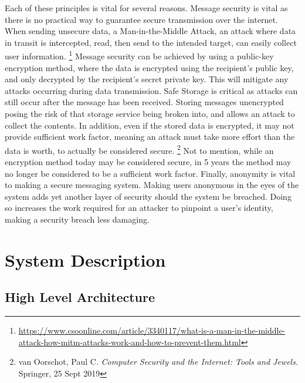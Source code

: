 \documentclass[titlepage]{article}
\begin{document}
      Each of these principles is vital for several reasons.
      Message security is vital as there is no practical way to guarantee secure transmission over the internet.
      When sending unsecure data, a Man-in-the-Middle Attack, an attack where data in transit is intercepted, read, then send to the intended target, can easily collect user information.
      \footnote{\url{https://www.csoonline.com/article/3340117/what-is-a-man-in-the-middle-attack-how-mitm-attacks-work-and-how-to-prevent-them.html}}
      Message security can be achieved by using a public-key encryption method, where the data is encrypted using the recipient's public key, and only decrypted by the recipient's secret private key.
      This will mitigate any attacks occurring during data transmission.
      Safe Storage is critical as attacks can still occur after the message has been received.
      Storing messages unencrypted posing the risk of that storage service being broken into, and allows an attack to collect the contents.
      In addition, even if the stored data is encrypted, it may not provide sufficient work factor, meaning an attack must take more effort than the data is worth, to actually be considered secure.
      \footnote{van Oorschot, Paul C. \textit{Computer Security and the Internet: Tools and Jewels}. Springer, 25 Sept 2019}
      Not to mention, while an encryption method today may be considered secure, in 5 years the method may no longer be considered to be a sufficient work factor.
      Finally, anonymity is vital to making a secure messaging system.
      Making users anonymous in the eyes of the system adds yet another layer of security should the system be breached.
      Doing so increases the work required for an attacker to pinpoint a user's identity, making a security breach less damaging.

    \section{System Description}

      \subsection{High Level Architecture}
\end{document}
